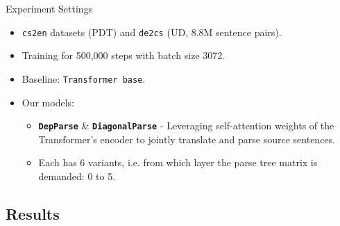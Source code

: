 \documentclass{beamer}
\def\de2cs{\texttt{de2cs}\xspace}
\def\cs2en{\texttt{cs2en}\xspace}
\def\transformer{Transformer\xspace}
\def\transformerbase{\texttt{Transformer base}\xspace}
\def\DiagonalParse{\texttt{DiagonalParse}\xspace}
\def\DepParse{\texttt{DepParse}\xspace}
\begin{document}
\begin{frame}{Experiment Settings}
    \begin{itemize}
        \item\cs2en datasets (PDT) and \de2cs \citep{machacek2018de2cs} (UD, 8.8M sentence pairs).
        \item Training for 500,000 steps with batch size 3072.
        \item Baseline: \transformerbase.
        \item Our models:
        \begin{itemize}
            \item \textbf{\DepParse} \& \textbf{\DiagonalParse} - Leveraging self-attention weights of the \transformer's encoder to jointly translate and parse source sentences.
            \item Each has 6 variants, i.e. from which layer the parse tree matrix is demanded: 0 to 5.
        \end{itemize}
    \end{itemize}
\end{frame}

\subsection{Results}
\end{document}
